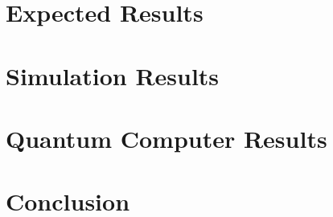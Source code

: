 \documentclass[12pt]{article}
\begin{document}
  \section{Expected Results}
  \blindtext

  \section{Simulation Results}
  \blindtext

  \section{Quantum Computer Results}
  \blindtext

  \section{Conclusion}
  \blindtext
\end{document}
